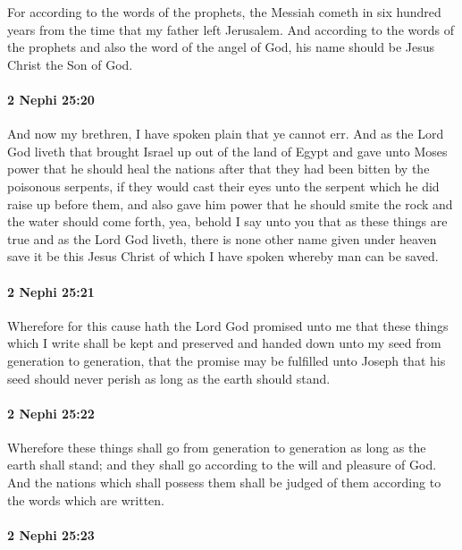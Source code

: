 			For according to the words of the prophets,
			the Messiah cometh in six hundred years
			from the time that my father left Jerusalem.
			And according to the words of the prophets
			and also the word of the angel of God,
			his name should be Jesus Christ the Son of God.

		\paragraph{2 Nephi 25:20} %
			\label{2NEPHI-25-20}

			And now my brethren, I have spoken plain that ye cannot err.
			And as the Lord God liveth that brought Israel up out of the land of Egypt
			and gave unto Moses power that he should heal the nations
			after that they had been bitten by the poisonous serpents,
			if they would cast their eyes unto the serpent which he did raise up before them,
			and also gave him power that he should smite the rock
			and the water should come forth,
			yea, behold I say unto you that as these things are true
			and as the Lord God liveth,
			there is none other name given under heaven
			save it be this Jesus Christ of which I have spoken
			whereby man can be saved.

		\paragraph{2 Nephi 25:21} %
			\label{2NEPHI-25-21}

			Wherefore for this cause hath the Lord God promised unto me
			that these things which I write shall be kept and preserved
			and handed down unto my seed from generation to generation,
			that the promise may be fulfilled unto Joseph
			that his seed should never perish as long as the earth should stand.

		\paragraph{2 Nephi 25:22} %
			\label{2NEPHI-25-22}

			Wherefore these things shall go from generation to generation
			as long as the earth shall stand;
			and they shall go according to the will and pleasure of God.
			And the nations which shall possess them shall be judged of them
			according to the words which are written.

		\paragraph{2 Nephi 25:23}
			\label{2NEPHI-25-23}
			
